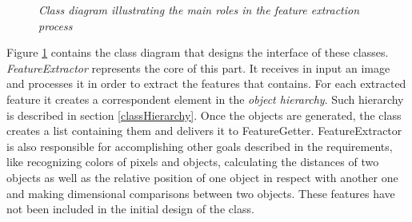 	\begin{figure}[h]
	  \begin{center} 
	  \end{center} 
	  \caption{\textit{Class diagram illustrating the main roles in the feature extraction process}}  
	  \label{fig:FeatureDesign}
 	\end{figure}
	
	Figure \ref{fig:FeatureDesign} contains the class diagram that designs the interface of these classes.
	\emph{FeatureExtractor} represents the core of this part. It receives in input an image and processes it in order to extract the features that contains. For each extracted feature it creates a correspondent element in the \emph{object hierarchy}. Such hierarchy is described in section \ref{classHierarchy}. Once the objects are generated, the class creates a list containing them and delivers it to FeatureGetter. 
	FeatureExtractor is also responsible for accomplishing other goals described in the requirements, like recognizing colors of pixels and objects, calculating the distances of two objects as well as the relative position of one object in respect with another one and making dimensional comparisons between two objects. These features have not been included in the initial design of the class. %

